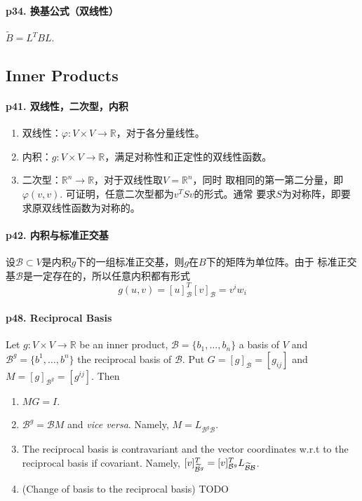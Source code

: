   \paragraph{p34. 换基公式（双线性）}
    $\tilde{B} = L^TBL$.

\subsection{Inner Products}
  \paragraph{p41. 双线性，二次型，内积}
    \begin{enumerate}
      \item 双线性：$\varphi:V\times V\to\mathbb{R}$，对于各分量线性。
      \item 内积：$g:V\times V\to\mathbb{R}$，满足对称性和正定性的双线性函数。
      \item 二次型：$\mathbb{R}^n\to\mathbb{R}$，对于双线性取$V=\mathbb{R}^n$，同时
      取相同的第一第二分量，即$\varphi(v,v)$. 可证明，任意二次型都为$v^TSv$的形式。通常
      要求$S$为对称阵，即要求原双线性函数为对称的。
    \end{enumerate}

  \paragraph{p42. 内积与标准正交基}
    设$\mathcal{B}\subset V$是内积$g$下的一组标准正交基，则$g$在$B$下的矩阵为单位阵。由于
    标准正交基$\mathcal{B}$是一定存在的，所以任意内积都有形式
    \[
      g(u,v) = [u]_{\mathcal{B}}^T [v]_{\mathcal{B}} = v^iw_i
    \]

  \paragraph{p48. Reciprocal Basis}
    Let $g:V\times V\to\mathbb{R}$ be an inner product, $\mathcal{B}=\{b_1,
    \dots,b_n\}$ a basis of $V$ and $\mathcal{B}^g=\{b^1,\dots,b^n\}$ the
    reciprocal basis of $\mathcal{B}$. Put $G=[g]_{\mathcal{B}}=[g_{ij}]$ and 
    $M=[g]_{\mathcal{B}^g}=[g^{ij}]$. Then
    \begin{enumerate}
      \item $MG=I$.
      \item $\mathcal{B}^g=\mathcal{B}M$ and \textit{vice versa}. Namely, 
            $M=L_{\mathcal{B}^g\mathcal{B}}$.
      \item The reciprocal basis is contravariant and the vector coordinates 
            w.r.t to the reciprocal basis if covariant. Namely, $[v]_{\widetilde{
            \mathcal{B}}^g}^T=[v]_{\mathcal{B}^g}^TL_{\widetilde{\mathcal{B}}
            \mathcal{B}}$.
      \item (Change of basis to the reciprocal basis) TODO
    \end{enumerate}


